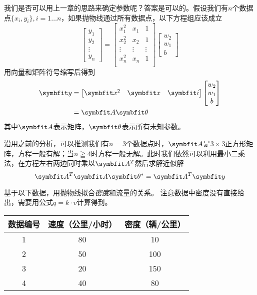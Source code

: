 我们是否可以用上一章的思路来确定参数呢？答案是可以的。假设我们有$n$个数据点$\{x_i,y_i\},i=1\ldots n$，如果抛物线通过所有数据点，以下方程组应该成立
\begin{equation}
    \begin{bmatrix}
        y_1\\
        y_2\\
        \vdots\\
        y_n
    \end{bmatrix}=
    \begin{bmatrix}
        x_1^2 & x_1 & 1\\
        x_2^2 & x_2 & 1\\
        \vdots & \vdots & \vdots\\
        x_n^2 & x_n & 1\\
    \end{bmatrix}
    \begin{bmatrix}
        w_2\\
        w_1\\
        b
    \end{bmatrix}
\end{equation}
用向量和矩阵符号缩写后得到
\begin{align}
    \Vy&=\begin{bmatrix}
        \Vx^2 &\Vx &\Vi
    \end{bmatrix}
    \begin{bmatrix}
        w_2\\
        w_1\\
        b
    \end{bmatrix}\\
    &=\MA\Vtheta
\end{align}
其中$\MA$表示矩阵，$\Vtheta$表示所有未知参数。

沿用之前的分析，可以推测我们有$n=3$个数据点时，$\MA$是$3×3$正方形矩阵，方程一般有解；当$n≧4$时方程一般无解。此时我们依然可以利用最小二乘法，在方程左右两边同时乘以$\MA^T$然后求解近似解
\begin{equation}
    \MA^T\MA\Vtheta^*=\MA^T\Vy
\end{equation}

\begin{example}
    基于以下数据，用抛物线拟合\emph{密度}和流量的关系。
    注意数据中密度没有直接给出，需要用公式$q=k·v$计算得到。
    \begin{center}
        \begin{tabular}{ccc}
            \toprule
            数据编号 & 速度（公里/小时） & 密度（辆/公里） \\
            \midrule
            1 & 80 & 10 \\
            2 & 50 & 100 \\
            3 & 20 & 150\\
            4 & 40 & 80\\
            \bottomrule
        \end{tabular}
    \end{center}
\end{example}

